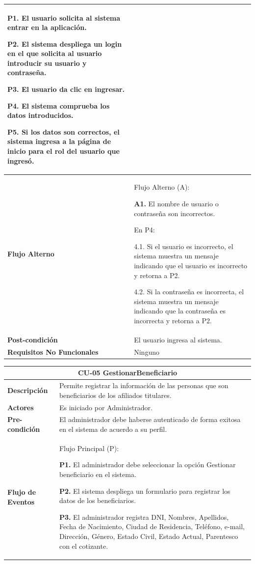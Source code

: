 \documentclass[12pt,a4paper]{article}
\begin{document}
\begin{center}
\begin{tabular}{|m{5.5cm}| m{9.5cm}|}
\textbf{P1.} El usuario solicita al sistema entrar en la aplicación.

\textbf{P2.} El sistema despliega un login en el que solicita al usuario introducir su usuario y contraseña.

\textbf{P3.} El usuario da clic en ingresar.

\textbf{P4.} El sistema comprueba los datos introducidos.

\textbf{P5.} Si los datos son correctos, el sistema ingresa a la página de inicio para el rol del usuario que ingresó.
\\
\hline 
\textbf{Flujo Alterno} &  Flujo Alterno (A):

\textbf{A1.} El nombre de usuario o contraseña son incorrectos.

	En P4:
	
	4.1. Si el usuario es incorrecto, el sistema muestra un mensaje indicando que el usuario es incorrecto y retorna a P2.
	
	4.2. Si la contraseña es incorrecta, el sistema muestra un mensaje indicando que la contraseña es incorrecta y retorna a P2. \\ 
\hline 
\textbf{Post-condición}  & El usuario ingresa al sistema. \\ 
\hline 
\textbf{Requisitos No Funcionales} & Ninguno \\ 
\hline 
\end{tabular}
\vspace{5mm}

\begin{tabular}{|m{5.5cm}| m{9.5cm}|}
\hline 
\multicolumn{2}{|c|}{\textbf{CU-05 GestionarBeneficiario}} \\ 
\hline 
\textbf{Descripción} & Permite registrar la información de las personas que son beneficiarios de los afiliados titulares. \\ 
\hline 
\textbf{Actores} & Es iniciado por Administrador. \\ 
\hline 
\textbf{Pre-condición} & El administrador debe haberse autenticado de forma exitosa en el sistema de acuerdo a su perfil. \\ 
\hline 
\textbf{Flujo de Eventos} & Flujo Principal (P):

\textbf{P1.} El administrador debe seleccionar la opción Gestionar beneficiario en el sistema.

\textbf{P2.} El sistema despliega un formulario para registrar los datos de los beneficiarios.

\textbf{P3.} El administrador registra DNI, Nombres, Apellidos, Fecha de Nacimiento, Ciudad de Residencia, Teléfono, e-mail, Dirección, Género, Estado Civil, Estado Actual, Parentesco con el cotizante.


\end{tabular}
\end{center}
\end{document}
